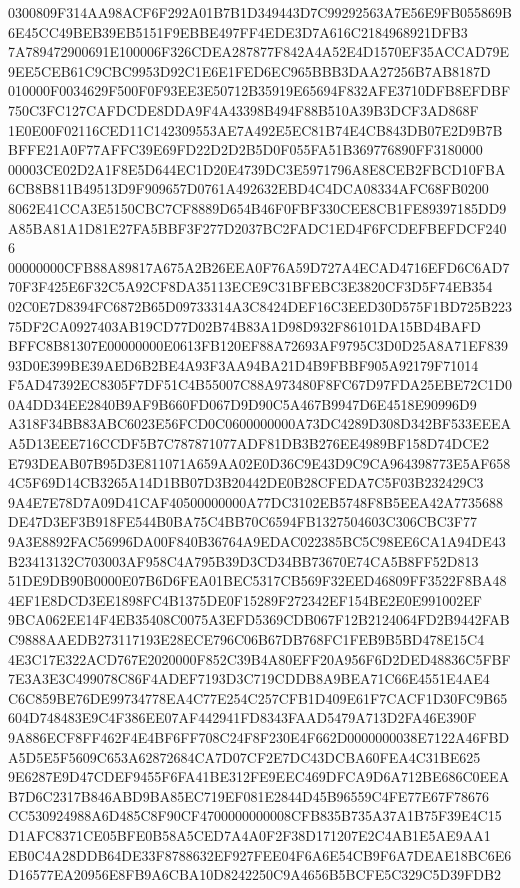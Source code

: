 \documentclass[UTF8,fontset=fandol,zihao=-4,a4paper]{ctexart}
\begin{document}
{{0300809F314AA98ACF6F292A01B7B1D349443D7C99292563A7E56E9FB055869B6E45CC49BEB39EB5151F9EBBE497FF4EDE3D7A616C2184968921DFB3
7A789472900691E100006F326CDEA287877F842A4A52E4D1570EF35ACCAD79E9EE5CEB61C9CBC9953D92C1E6E1FED6EC965BBB3DAA27256B7AB8187D
010000F0034629F500F0F93EE3E50712B35919E65694F832AFE3710DFB8EFDBF750C3FC127CAFDCDE8DDA9F4A43398B494F88B510A39B3DCF3AD868F
1E0E00F02116CED11C142309553AE7A492E5EC81B74E4CB843DB07E2D9B7BBFFE21A0F77AFFC39E69FD22D2D2B5D0F055FA51B369776890FF3180000
00003CE02D2A1F8E5D644EC1D20E4739DC3E5971796A8E8CEB2FBCD10FBA6CB8B811B49513D9F909657D0761A492632EBD4C4DCA08334AFC68FB0200
8062E41CCA3E5150CBC7CF8889D654B46F0FBF330CEE8CB1FE89397185DD9A85BA81A1D81E27FA5BBF3F277D2037BC2FADC1ED4F6FCDEFBEFDCF2406
00000000CFB88A89817A675A2B26EEA0F76A59D727A4ECAD4716EFD6C6AD770F3F425E6F32C5A92CF8DA35113ECE9C31BFEBC3E3820CF3D5F74EB354
02C0E7D8394FC6872B65D09733314A3C8424DEF16C3EED30D575F1BD725B22375DF2CA0927403AB19CD77D02B74B83A1D98D932F86101DA15BD4BAFD
BFFC8B81307E00000000E0613FB120EF88A72693AF9795C3D0D25A8A71EF83993D0E399BE39AED6B2BE4A93F3AA94BA21D4B9FBBF905A92179F71014
F5AD47392EC8305F7DF51C4B55007C88A973480F8FC67D97FDA25EBE72C1D00A4DD34EE2840B9AF9B660FD067D9D90C5A467B9947D6E4518E90996D9
A318F34BB83ABC6023E56FCD0C0600000000A73DC4289D308D342BF533EEEAA5D13EEE716CCDF5B7C787871077ADF81DB3B276EE4989BF158D74DCE2
E793DEAB07B95D3E811071A659AA02E0D36C9E43D9C9CA964398773E5AF6584C5F69D14CB3265A14D1BB07D3B20442DE0B28CFEDA7C5F03B232429C3
9A4E7E78D7A09D41CAF40500000000A77DC3102EB5748F8B5EEA42A7735688DE47D3EF3B918FE544B0BA75C4BB70C6594FB1327504603C306CBC3F77
9A3E8892FAC56996DA00F840B36764A9EDAC022385BC5C98EE6CA1A94DE43B23413132C703003AF958C4A795B39D3CD34BB73670E74CA5B8FF52D813
51DE9DB90B0000E07B6D6FEA01BEC5317CB569F32EED46809FF3522F8BA484EF1E8DCD3EE1898FC4B1375DE0F15289F272342EF154BE2E0E991002EF
9BCA062EE14F4EB35408C0075A3EFD5369CDB067F12B2124064FD2B9442FABC9888AAEDB273117193E28ECE796C06B67DB768FC1FEB9B5BD478E15C4
4E3C17E322ACD767E2020000F852C39B4A80EFF20A956F6D2DED48836C5FBF7E3A3E3C499078C86F4ADEF7193D3C719CDDB8A9BEA71C66E4551E4AE4
C6C859BE76DE99734778EA4C77E254C257CFB1D409E61F7CACF1D30FC9B65604D748483E9C4F386EE07AF442941FD8343FAAD5479A713D2FA46E390F
9A886ECF8FF462F4E4BF6FF708C24F8F230E4F662D0000000038E7122A46FBDA5D5E5F5609C653A62872684CA7D07CF2E7DC43DCBA60FEA4C31BE625
9E6287E9D47CDEF9455F6FA41BE312FE9EEC469DFCA9D6A712BE686C0EEAB7D6C2317B846ABD9BA85EC719EF081E2844D45B96559C4FE77E67F78676
CC530924988A6D485C8F90CF4700000000008CFB835B735A37A1B75F39E4C15D1AFC8371CE05BFE0B58A5CED7A4A0F2F38D171207E2C4AB1E5AE9AA1
EB0C4A28DDB64DE33F8788632EF927FEE04F6A6E54CB9F6A7DEAE18BC6E6D16577EA20956E8FB9A6CBA10D8242250C9A4656B5BCFE5C329C5D39FDB2
}}
\end{document}
